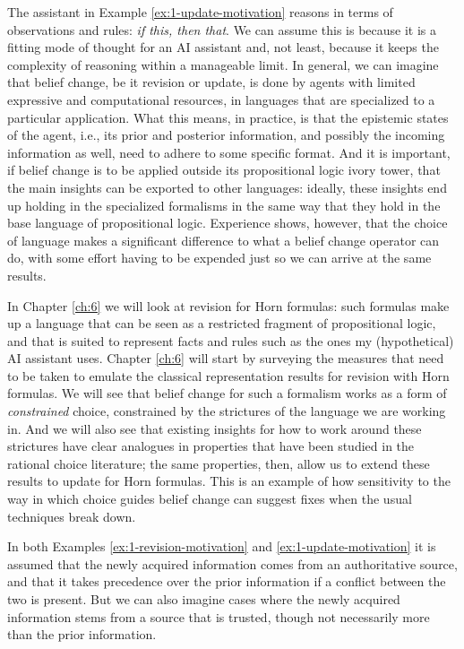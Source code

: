 The assistant in Example \ref{ex:1-update-motivation}
reasons in terms of observations and rules: 
\emph{if this, then that}.
We can assume this is because it is a fitting
mode of thought for an AI assistant and, not least,
because it keeps the complexity of reasoning within a 
manageable limit.
In general, we can imagine that belief change,
be it revision or update, is done by agents with
limited expressive and computational resources,
in languages that are specialized to a particular 
application. 
What this means, in practice, is that the epistemic states 
of the agent, i.e., its prior and posterior information,
and possibly the incoming information as well,
need to adhere to some specific format.
And it is important, if belief change is to be applied 
outside its propositional logic ivory tower,
that the main insights can be exported to other languages:
ideally, these insights end up holding in the specialized 
formalisms in the same way that they hold in the base 
language of propositional logic.
Experience shows, however, that the choice 
of language makes a significant difference 
to what a belief change operator can do,
with some effort having to be expended just so we can 
arrive at the same results.

In Chapter \ref{ch:6} we will look at 
revision for Horn formulas:
such formulas make up a language that can be 
seen as a restricted fragment of propositional logic,
and that is suited to represent 
facts and rules such as the ones my
(hypothetical) AI assistant uses.
Chapter \ref{ch:6} will start by surveying 
the measures that need to be taken 
to emulate the classical representation results
for revision with Horn formulas.
We will see that belief change for such 
a formalism works as a form of \emph{constrained} choice,
constrained by the strictures of the 
language we are working in. 
And we will also see that existing insights 
for how to work around these strictures
have clear analogues 
in properties that have been studied in 
the rational choice literature;
the same properties, then, allow us to 
extend these results to update for Horn formulas.
This is an example of how sensitivity to 
the way in which choice guides belief change can 
suggest fixes when the usual techniques break down.

In both Examples \ref{ex:1-revision-motivation} 
and \ref{ex:1-update-motivation}
it is assumed that the newly acquired information 
comes from an authoritative source,
and that it takes precedence over the prior information
if a conflict between the two is present.
But we can also imagine cases where the newly acquired information 
stems from a source that is trusted, though not necessarily more 
than the prior information.

